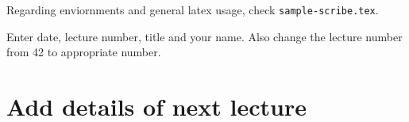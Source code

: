 
Regarding enviornments and general latex usage, check {\tt sample-scribe.tex}.
\begin{note}
	Enter date, lecture number, title and your name. Also change the
	lecture number from 42 to appropriate number.
\end{note}



\section{Add details of next lecture}

